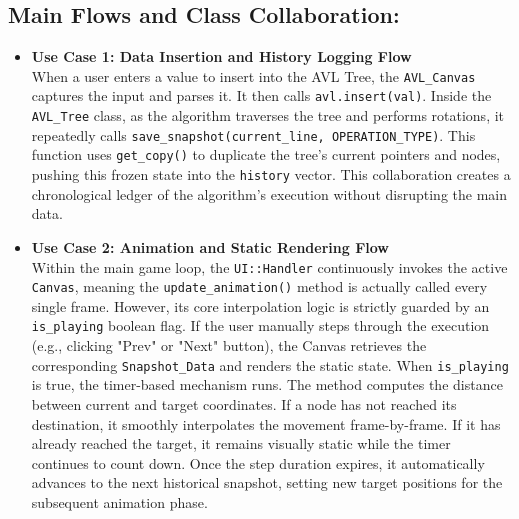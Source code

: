 \subsection{Main Flows and Class Collaboration:}
\begin{itemize}
    \item \textbf{Use Case 1: Data Insertion and History Logging Flow} \\
    When a user enters a value to insert into the AVL Tree, the \texttt{AVL\_Canvas} captures the input and parses it. It then calls \texttt{avl.insert(val)}. Inside the \texttt{AVL\_Tree} class, as the algorithm traverses the tree and performs rotations, it repeatedly calls \texttt{save\_snapshot(current\_line, OPERATION\_TYPE)}. This function uses \texttt{get\_copy()} to duplicate the tree's current pointers and nodes, pushing this frozen state into the \texttt{history} vector. This collaboration creates a chronological ledger of the algorithm's execution without disrupting the main data.

    \item \textbf{Use Case 2: Animation and Static Rendering Flow} \\
    Within the main game loop, the \texttt{UI::Handler} continuously invokes the active \texttt{Canvas}, meaning the \texttt{update\_animation()} method is actually called every single frame. However, its core interpolation logic is strictly guarded by an \texttt{is\_playing} boolean flag. If the user manually steps through the execution (e.g., clicking "Prev" or "Next" button), the Canvas retrieves the corresponding \texttt{Snapshot\_\allowbreak Data} and renders the static state. When \texttt{is\_playing} is true, the timer-based mechanism runs. The method computes the distance between current and target coordinates. If a node has not reached its destination, it smoothly interpolates the movement frame-by-frame. If it has already reached the target, it remains visually static while the timer continues to count down. Once the step duration expires, it automatically advances to the next historical snapshot, setting new target positions for the subsequent animation phase.
\end{itemize}